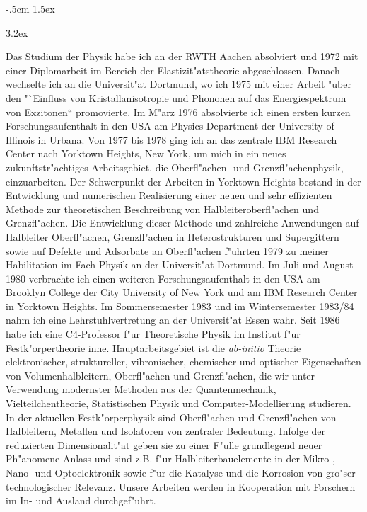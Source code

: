 \pagestyle{empty}
\textwidth16.0cm 
\evensidemargin-.5cm 
\topmargin-0.0cm 
\renewcommand{\baselinestretch}{1.6}
\parskip1.5ex

\parindent0pt
\baselineskip3.2ex

Das Studium der Physik habe ich an der RWTH Aachen absolviert und 1972 mit einer 
Diplomarbeit im Bereich der Elastizit"atstheorie abgeschlossen. 
Danach wechselte ich an die Universit"at Dortmund, wo ich 1975 mit 
einer Arbeit "uber den "`Einfluss von Kristallanisotropie und Phononen auf das 
Energiespektrum von Exzitonen`` promovierte. Im M"arz 1976 absolvierte ich einen 
ersten kurzen Forschungsaufenthalt in den USA am Physics Department der University 
of Illinois in Urbana. Von 1977 bis 1978 ging ich an das zentrale IBM 
Research Center nach Yorktown Heights, New York, um mich in ein neues 
zukunftstr"achtiges Arbeitsgebiet, die Oberfl"achen- und Grenzfl"achenphysik,
einzuarbeiten. Der Schwerpunkt der Arbeiten in Yorktown Heights bestand in der 
Entwicklung und numerischen Realisierung einer neuen und sehr effizienten
Methode zur theoretischen Beschreibung von Halbleiteroberfl"achen und 
Grenzfl"achen. Die Entwicklung dieser Methode und zahlreiche Anwendungen auf 
Halbleiter Oberfl"achen, Grenzfl"achen in Heterostrukturen und Supergittern 
sowie auf Defekte und Adsorbate an Oberfl"achen f"uhrten 1979 zu meiner 
Habilitation im Fach Physik an der Universit"at Dortmund. Im Juli und August 1980 
verbrachte ich einen weiteren Forschungsaufenthalt in den USA am Brooklyn College 
der City University of New York und am IBM Research Center in Yorktown Heights.  
Im Sommersemester 1983 und im Wintersemester 1983/84 nahm ich eine Lehrstuhlvertretung 
an der Universit"at Essen wahr. Seit 1986 habe ich eine C4-Professor f"ur Theoretische 
Physik im Institut f"ur Festk"orpertheorie inne. Hauptarbeitsgebiet ist die 
{\it ab-initio} Theorie elektronischer, struktureller, vibronischer,
chemischer und optischer Eigenschaften von Volumenhalbleitern, Oberfl"achen und 
Grenzfl"achen, die wir unter Verwendung modernster Methoden aus der  
Quantenmechanik, Vielteilchentheorie, Statistischen Physik und  
Computer-Mo\-del\-lie\-rung studieren. In der aktuellen Festk"orperphysik sind 
Oberfl"achen und Grenzfl"achen von Halbleitern, Metallen und Isolatoren von 
zentraler Bedeutung. Infolge der reduzierten Dimensionalit"at geben sie zu einer 
F"ulle grundlegend neuer Ph"anomene Anlass und sind z.B. f"ur Halbleiterbauelemente 
in der Mikro-, Nano- und Optoelektronik sowie f"ur die Katalyse und die Korrosion 
von gro"ser technologischer Relevanz. Unsere Arbeiten werden in Kooperation mit 
Forschern im In- und Ausland durchgef"uhrt.

